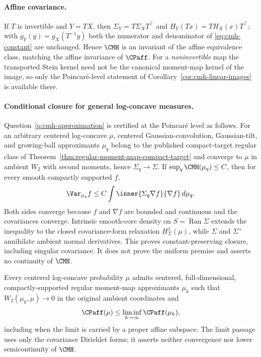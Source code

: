 \documentclass[../../main.tex]{subfiles}
\begin{document}
\paragraph{Affine covariance.}
If $T$ is invertible and $Y=TX$, then $\Sigma_Y=T\Sigma_XT^\top$ and
$H_Y(Tx)=TH_X(x)T^\top$; with $g_Y(y)=g_X(T^{-1}y)$ both the numerator and denominator of
\eqref{eq:cmh-constant} are unchanged. Hence $\CMH$ is an invariant of the affine equivalence
class, matching the affine invariance of $\CPaff$. For a \emph{noninvertible} map the
transported Stein kernel need not be the canonical moment-map kernel of the image, so only the
Poincar\'e-level statement of Corollary~\ref{cor:cmh-linear-images} is available there.

\paragraph{Conditional closure for general log-concave measures.}
Question~\ref{q:cmh-approximation} is certified at the Poincar\'e level as follows. For an
arbitrary centered log-concave $\mu$, centered Gaussian-convolution, Gaussian-tilt, and
growing-ball approximants $\mu_q$ belong to the published compact-target regular class of
Theorem~\ref{thm:regular-moment-map-compact-target} and converge to $\mu$ in ambient $W_2$ with
second moments, hence $\Sigma_q\to\Sigma$. If $\sup_q\CMH(\mu_q)\le C$, then for every smooth
compactly supported $f$,
\[
  \Var_{\mu_q}f\le C\int\inner{\Sigma_q\nabla f}{\nabla f}\,d\mu_q.
\]
Both sides converge because $f$ and $\nabla f$ are bounded and continuous and the covariances
converge. Intrinsic smooth-core density on $S=\operatorname{Ran}\Sigma$ extends the inequality to
the closed covariance-form relaxation $H^1_\Sigma(\mu)$, while $\Sigma$ and $\Sigma^+$ annihilate
ambient normal derivatives. This proves constant-preserving closure, including singular
covariance. It does not prove the uniform premise and asserts no continuity of $\CMH$.

\begin{lemma}
\label{lem:affine-poincare-w2-liminf}
Every centered log-concave probability $\mu$ admits centered, full-dimensional,
compactly-supported regular moment-map approximants $\mu_k$ such that
$W_2(\mu_k,\mu)\to0$ in the original ambient coordinates and
\begin{equation}
  \CPaff(\mu)\le\liminf_{k\to\infty}\CPaff(\mu_k),
  \label{eq:affine-poincare-w2-liminf}
\end{equation}
including when the limit is carried by a proper affine subspace.  The limit passage uses only the
covariance Dirichlet forms; it asserts neither convergence nor lower semicontinuity of $\CMH$.
\end{lemma}
\end{document}
